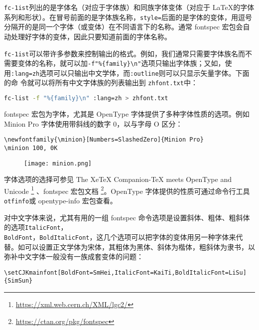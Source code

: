 \verb|fc-1ist|列出的是字体名（对应于字体族）和同族字体变体（对应于 \LaTeX 的字体系列和形状）。在冒号前面的是字体族名称，\verb|style=|后面的是字体的变体，用逗号分隔开的是同一个字体（或变体）在不同语言下的名称。通常 fontspec 宏包会自动处理好字体的变体，因此只要知道前面的字体名称。

\verb|fc-1ist|可以带许多参数来控制输出的格式。例如，我们通常只需要字体族名而不需要变体的名称，就可以加\verb|-f"%{family}\n"|选项只输出字体族；又如，使用\verb|:lang=zh|选项可以只输出中文学体，而\verb|:outline|则可以只显示矢量字体。下面的命
令就可以将所有中文字体族的列表输出到 \verb|zhfont.txt|中：
\begin{lstlisting}[language=sh]
    fc-list -f "%{family}\n" :lang=zh > zhfont.txt
\end{lstlisting}

fontspec 宏包为字体，尤其是 OpenType 字体提供了多种字体性质的选项。例如 Minion Pro 字体使用带斜线的数字 0，以与字母 O 区分：

\begin{minipage}[t]{0.45\textwidth}
\begin{lstlisting}
\newfontfamily{\minion}[Numbers=SlashedZero]{Minion Pro}
\minion 100, 0K
\end{lstlisting}
\end{minipage}
\hfill
\begin{minipage}[t]{0.45\textwidth}
\begin{figure}[H]
    \centering
    \texttt{[image: minion.png]}
\end{figure}
\end{minipage}

字体选项的选择可参见 The XeTeX Companion-TeX meets OpenType and Unicode \footnote{ \href{https://xml.web.cern.ch/XML/lgc2/}{https://xml.web.cern.ch/XML/lgc2/}} 、fontspec 宏包文档 \footnote{\href{https://ctan.org/pkg/fontspec}{https://ctan.org/pkg/fontspec}}。OpenType
字体提供的性质可通过命令行工具 \verb|otfinfo|或 opentype-info 宏包查看。

对中文字体来说，尤其有用的一组 fontspec 命令选项是设置斜体、粗体、粗斜体的选项\verb|ItalicFont|，\\
\verb|BoldFont|，\verb|BoldItalicFont|，这几个选项可以把字体的变体用另一种字体来代替。如可以设置正文学体为宋体，其粗体为黑体、斜体为楷体，粗斜体为隶书，以弥补中文字体一般没有一族成套变体的问题：

\begin{lstlisting}
\setCJKmainfont[BoldFont=SmHei,ItalicFont=KaiTi,BoldItalicFont=LiSu]{SimSun}
\end{lstlisting}

